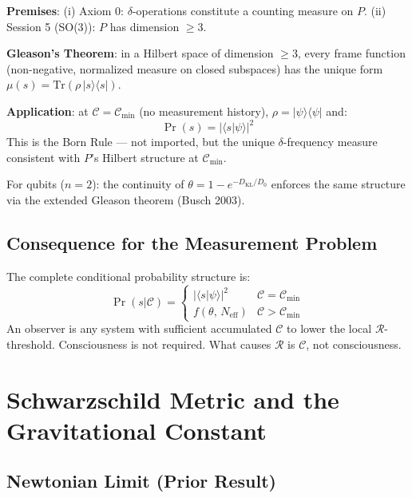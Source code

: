 \documentclass[12pt]{article}
\begin{document}
\begin{derivedbox}
\textbf{Premises}: (i) Axiom 0: $\delta$-operations constitute a
counting measure on $P$. (ii) Session 5 (SO(3)): $P$ has
dimension $\geq 3$.

\textbf{Gleason's Theorem}: in a Hilbert space of dimension
$\geq 3$, every frame function (non-negative, normalized measure
on closed subspaces) has the unique form
$\mu(s) = \mathrm{Tr}(\rho\,|s\rangle\langle s|)$.

\textbf{Application}: at $\mathcal{C} = \mathcal{C}_{\min}$
(no measurement history), $\rho = |\psi\rangle\langle\psi|$ and:
\[
  \Pr(s) = |\langle s|\psi\rangle|^2
\]
This is the Born Rule --- not imported, but the unique
$\delta$-frequency measure consistent with $P$'s Hilbert
structure at $\mathcal{C}_{\min}$.

For qubits ($n=2$): the continuity of
$\theta = 1 - e^{-D_{\mathrm{KL}}/D_0}$ enforces the same
structure via the extended Gleason theorem (Busch 2003).
\end{derivedbox}

\subsection{Consequence for the Measurement Problem}

The complete conditional probability structure is:
\[
  \Pr(s|\mathcal{C}) =
  \begin{cases}
    |\langle s|\psi\rangle|^2 & \mathcal{C} = \mathcal{C}_{\min} \\
    f(\theta,\, N_{\mathrm{eff}}) & \mathcal{C} > \mathcal{C}_{\min}
  \end{cases}
\]
An observer is any system with sufficient accumulated $\mathcal{C}$
to lower the local $\mathcal{R}$-threshold. Consciousness is not
required. What causes $\mathcal{R}$ is $\mathcal{C}$, not
consciousness.

\section{Schwarzschild Metric and the Gravitational Constant}

\subsection{Newtonian Limit (Prior Result)}
\end{document}
